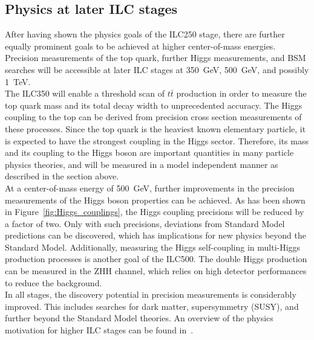 \subsection{Physics at later ILC stages}
After having shown the physics goals of the ILC250 stage, there are further equally prominent goals to be achieved at higher center-of-mass energies.
Precision measurements of the top quark, further Higgs measurements, and BSM searches will be accessible at later ILC stages at \SI{350}{\GeV}, \SI{500}{\GeV}, and possibly \SI{1}{\TeV}.
\\The ILC350 will enable a threshold scan of $t\bar{t}$ production in order to measure the top quark mass and its total decay width to unprecedented accuracy.
The Higgs coupling to the top can be derived from precision cross section measurements of these processes.
Since the top quark is the heaviest known elementary particle, it is expected to have the strongest coupling in the Higgs sector.
Therefore, its mass and its coupling to the Higgs boson are important quantities in many particle physics theories, and will be measured in a model independent manner as described in the section above.
\\At a center-of-mass energy of \SI{500}{\GeV}, further improvements in the precision measurements of the Higgs boson properties can be achieved.
As has been shown in Figure~\ref{fig:Higgs_couplings}, the Higgs coupling precisions will be reduced by a factor of two.
Only with such precisions, deviations from Standard Model predictions can be discovered, which has implications for new physics beyond the Standard Model.
Additionally, measuring the Higgs self-coupling in multi-Higgs production processes is another goal of the ILC500.
The double Higgs production can be measured in the ZHH channel, which relies on high detector performances to reduce the background.
\\In all stages, the discovery potential in precision measurements is considerably improved.
This includes searches for dark matter, supersymmetry (SUSY), and further beyond the Standard Model theories.
An overview of the physics motivation for higher ILC stages can be found in~\cite{PhysicsCase}.

